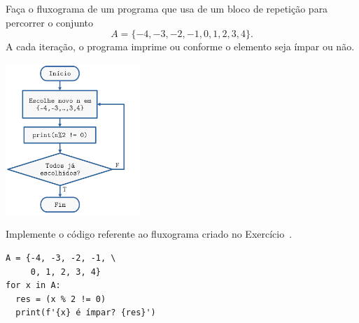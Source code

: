 \begin{exer}\label{cap_progest_sec_est:exer:for}
  Faça o fluxograma de um programa que usa de um bloco de repetição {\PYTHONfor} para percorrer o conjunto
  \begin{equation}
    A = \{-4, -3, -2, -1, 0, 1, 2, 3, 4\}.
  \end{equation}
  A cada iteração, o programa imprime {\PYTHONTrue} ou {\PYTHONFalse} conforme o elemento seja ímpar ou não.
\end{exer}
\begin{resp}
  
  \includegraphics[width=2in]{cap_progest/dados/fig_exer_for/fig.png}

\end{resp}

\begin{exer}
  Implemente o código referente ao fluxograma criado no Exercício~.
\end{exer}
\begin{resp}

\begin{lstlisting}
A = {-4, -3, -2, -1, \
     0, 1, 2, 3, 4}
for x in A:
  res = (x % 2 != 0)
  print(f'{x} é ímpar? {res}')
\end{lstlisting}

\end{resp}

